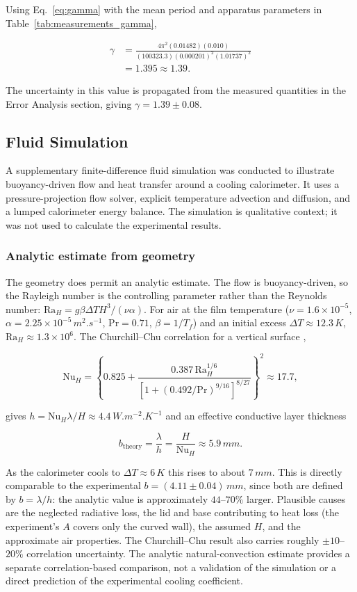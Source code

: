 \documentclass[12pt,a4paper]{article}
\begin{document}
Using Eq.~\eqref{eq:gamma} with the mean period and apparatus
parameters in Table~\ref{tab:measurements_gamma},

\begin{align*}
    \gamma
    &=\frac{4\pi^2(0.01482)(0.010)}
    {(100323.3)(0.000201)^2(1.01737)^2}\\
    &=1.395\approx1.39.
\end{align*}

The uncertainty in this value is propagated from the measured
quantities in the Error Analysis section, giving
$\gamma=1.39\pm0.08$.

\subsection{Fluid Simulation}

A supplementary finite-difference fluid simulation was conducted
to illustrate buoyancy-driven flow and heat transfer around a
cooling calorimeter. It uses a pressure-projection flow solver,
explicit temperature advection and diffusion, and a lumped
calorimeter energy balance. The simulation is qualitative context;
it was not used to calculate the experimental results.

\subsubsection{Analytic estimate from geometry}

The geometry does permit an analytic estimate. The flow is
buoyancy-driven, so the Rayleigh number is the controlling
parameter rather than the Reynolds number:
$\mathrm{Ra}_H=g\beta\Delta T H^3/(\nu\alpha)$.
For air at the film temperature ($\nu=1.6\times10^{-5}$,
$\alpha=2.25\times10^{-5}\,\si{m^2.s^{-1}}$, $\mathrm{Pr}=0.71$,
$\beta=1/T_f$) and an initial excess $\Delta T\approx12.3\,\si{K}$,
$\mathrm{Ra}_H\approx1.3\times10^{6}$. The Churchill--Chu correlation
for a vertical surface \cite{incropera2018},

\[
    \mathrm{Nu}_H=\left\{0.825+\frac{0.387\,\mathrm{Ra}_H^{1/6}}
    {\left[1+(0.492/\mathrm{Pr})^{9/16}\right]^{8/27}}\right\}^2
    \approx 17.7,
\]

gives $h=\mathrm{Nu}_H\lambda/H\approx4.4\,\si{W.m^{-2}.K^{-1}}$ and an
effective conductive layer thickness

\[
    b_{\mathrm{theory}}=\frac{\lambda}{h}=\frac{H}{\mathrm{Nu}_H}
    \approx5.9\,\si{mm}.
\]

As the calorimeter cools to $\Delta T\approx6\,\si{K}$ this rises to
about $7\,\si{mm}$. This is directly comparable to the experimental
$b=(4.11\pm0.04)\,\si{mm}$, since both are defined by
$b=\lambda/h$: the analytic value is approximately $44$--$70\%$
larger. Plausible
causes are the neglected radiative loss, the lid and base
contributing to heat loss (the experiment's $A$ covers only the
curved wall), the assumed $H$, and the approximate air
properties. The Churchill--Chu result also carries roughly
$\pm10$--$20\%$ correlation uncertainty. The analytic natural-convection
estimate provides a separate correlation-based comparison, not a
validation of the simulation or a direct prediction of the
experimental cooling coefficient.
\end{document}
